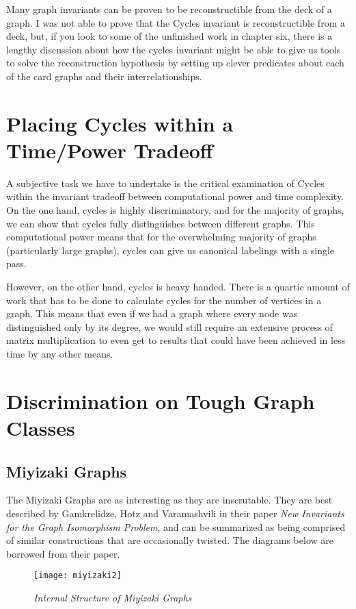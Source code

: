 Many graph invariants can be proven to be reconstructible from the deck of a graph.
I was not able to prove that the Cycles invariant is reconstructible from a deck, but, if you look to some of the unfinished work in chapter six, there is a lengthy discussion about how the cycles invariant might be able to give us tools to solve the reconstruction hypothesis by setting up clever predicates about each of the card graphs and their interrelationships.

\section{Placing Cycles within a Time/Power Tradeoff}
A subjective task we have to undertake is the critical examination of Cycles within the invariant tradeoff between computational power and time complexity.
On the one hand, cycles is highly discriminatory, and for the majority of graphs, we can show that cycles fully distinguishes between different graphs.
This computational power means that for the overwhelming majority of graphs (particularly large graphs), cycles can give us canonical labelings with a single pass.

However, on the other hand, cycles is heavy handed. There is a quartic amount of work that has to be done to calculate cycles for the number of vertices in a graph.
This means that even if we had a graph where every node was distinguished only by its degree, we would still require an extensive process of matrix multiplication to even get to results that could have been achieved in less time by any other means.

\section{Discrimination on Tough Graph Classes}

\subsection{Miyizaki Graphs}
The Miyizaki Graphs are as interesting as they are inscrutable.
They are best described by Gamkrelidze, Hotz and Varamashvili in their paper \emph{New Invariants for the Graph Isomorphism Problem}, and can be summarized as being comprised of similar constructions that are occasionally twisted.
The diagrams below are borrowed from their paper.

\begin{figure}[h]
\caption{\emph{Internal Structure of Miyizaki Graphs}}
\centering
\texttt{[image: miyizaki2]}
\label{fig:miyizaki2}
\end{figure}

